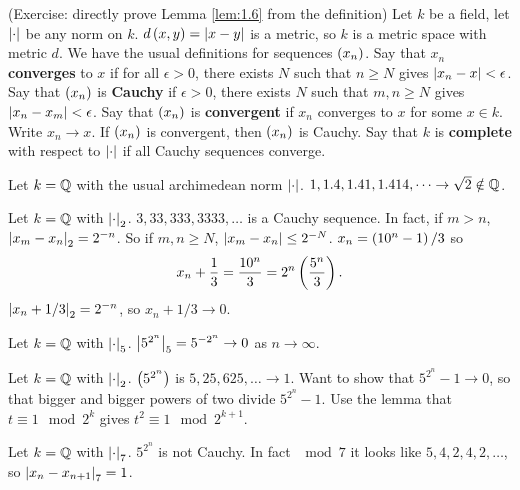 (Exercise: directly prove Lemma \ref{lem:1.6} from the definition) Let $ k $ be a field, let $ \left\lvert \cdot \right\rvert $ be any norm on $ k $. $ d\left( x, y \right) = \left\lvert x - y \right\rvert $ is a metric, so $ k $ is a metric space with metric $ d $. We have the usual definitions for sequences $ \left( x_n \right) $. Say that $ x_n $ \textbf{converges} to $ x $ if for all $ \epsilon > 0 $, there exists $ N $ such that $ n \ge N $ gives $ \left\lvert x_n - x \right\rvert < \epsilon $. Say that $ \left( x_n \right) $ is \textbf{Cauchy} if $ \epsilon > 0 $, there exists $ N $ such that $ m, n \ge N $ gives $ \left\lvert x_n - x_m \right\rvert < \epsilon $. Say that $ \left( x_n \right) $ is \textbf{convergent} if $ x_n $ converges to $ x $ for some $ x \in k $. Write $ x_n \to x $. If $ \left( x_n \right) $ is convergent, then $ \left( x_n \right) $ is Cauchy. Say that $ k $ is \textbf{complete} with respect to $ \left\lvert \cdot \right\rvert $ if all Cauchy sequences converge.

\pagebreak

\begin{example*}
Let $ k = \mathbb{Q} $ with the usual archimedean norm $ \left\lvert \cdot \right\rvert $. $ 1, 1.4, 1.41, 1.414, \dots \to \sqrt{2} \notin \mathbb{Q} $.
\end{example*}

\begin{example*}
Let $ k = \mathbb{Q} $ with $ \left\lvert \cdot \right\rvert_2 $. $ 3, 33, 333, 3333, \dots $ is a Cauchy sequence. In fact, if $ m > n $, $ \left\lvert x_m - x_n \right\rvert_2 = 2^{-n} $. So if $ m, n \ge N $, $ \left\lvert x_m - x_n \right\rvert \le 2^{-N} $. $ x_n = \left( 10^n - 1 \right) / 3 $ so
$$ x_n + \dfrac{1}{3} = \dfrac{10^n}{3} = 2^n\left( \dfrac{5^n}{3} \right). $$
$ \left\lvert x_n + 1 / 3 \right\rvert_2 = 2^{-n} $, so $ x_n + 1 / 3 \to 0 $.
\end{example*}

\begin{example*}
Let $ k = \mathbb{Q} $ with $ \left\lvert \cdot \right\rvert_5 $. $ \left\lvert 5^{2^n} \right\rvert_5 = 5^{-2^n} \to 0 $ as $ n \to \infty $.
\end{example*}

\begin{example*}
Let $ k = \mathbb{Q} $ with $ \left\lvert \cdot \right\rvert_2 $. $ \left( 5^{2^n} \right) $ is $ 5, 25, 625, \dots \to 1 $. Want to show that $ 5^{2^n} - 1 \to 0 $, so that bigger and bigger powers of two divide $ 5^{2^n} - 1 $. Use the lemma that $ t \equiv 1 \mod 2^k $ gives $ t^2 \equiv 1 \mod 2^{k + 1} $.
\end{example*}

\begin{example*}
Let $ k = \mathbb{Q} $ with $ \left\lvert \cdot \right\rvert_7 $. $ 5^{2^n} $ is not Cauchy. In fact $ \mod 7 $ it looks like $ 5, 4, 2, 4, 2, \dots $, so $ \left\lvert x_n - x_{n + 1} \right\rvert_7 = 1 $.
\end{example*}


